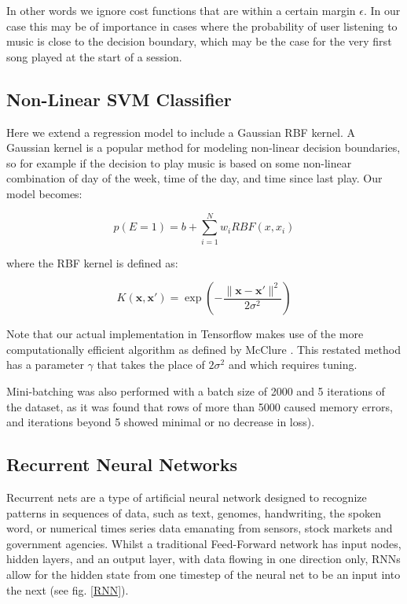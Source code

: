 In other words we ignore cost functions that are within a certain margin  $\epsilon$. In our case this may be of importance in cases where the probability of user listening to music is close to the decision boundary, which may be the case for the very first song played at the start of a session.

\subsection{Non-Linear SVM Classifier}

Here we extend a regression model to include a Gaussian RBF kernel. A Gaussian kernel is a popular method for modeling non-linear decision boundaries, so for example if the decision to play music is based on some non-linear combination of day of the week, time of the day, and time since last play. Our model becomes:

$$p(E=1)=b+\sum^N_{i=1}w_iRBF(x,x_i)$$

where the RBF kernel is defined as:

$$K(\mathbf {x} ,\mathbf {x'} )=\exp \left(-{\frac {\|\mathbf {x} -\mathbf {x'} \|^{2}}{2\sigma ^{2}}}\right)$$

Note that our actual implementation in Tensorflow makes use of the more computationally efficient algorithm as defined by McClure \parencite{TFCookbook}. This restated method has a parameter $\gamma$ that takes the place of $2\sigma^2$ and which requires tuning.

Mini-batching was also performed with a batch size of 2000 and 5 iterations of the dataset, as it was found that rows of more than 5000 caused memory errors, and iterations beyond 5 showed minimal or no decrease in loss).

\subsection{Recurrent Neural Networks}

Recurrent nets are a type of artificial neural network designed to recognize patterns in sequences of data, such as text, genomes, handwriting, the spoken word, or numerical times series data emanating from sensors, stock markets and government agencies. Whilst a traditional Feed-Forward network \parencite{MLP} has input nodes, hidden layers, and an output layer, with data flowing in one direction only, RNNs allow for the hidden state from one timestep of the neural net to be an input into the next (see fig. \ref{RNN}).

